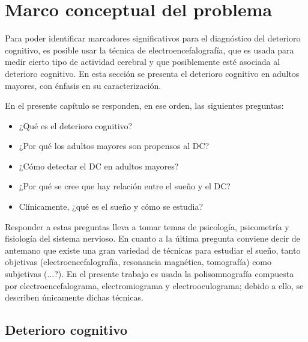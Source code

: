 
\chapter{Marco conceptual del problema}

Para poder identificar marcadores significativos para el diagnóstico del deterioro cognitivo, es 
posible usar la técnica de electroencefalografía, que es usada para medir cierto tipo de actividad 
cerebral y que posiblemente esté asociada al deterioro cognitivo. 
%
En esta sección se presenta el deterioro cognitivo en adultos mayores, con énfasis en su 
caracterización.

En el presente capítulo se responden, en ese orden, las siguientes preguntas:
\begin{itemize}
\item ¿Qué es el deterioro cognitivo?
\item ¿Por qué los adultos mayores son propensos al DC?
\item ¿Cómo detectar el DC en adultos mayores?
\item ¿Por qué se cree que hay relación entre el sueño y el DC?
\item Clínicamente, ¿qué es el sueño y cómo se estudia?
\end{itemize}

Responder a estas preguntas lleva a tomar temas de psicología, psicometría y fisiología del sistema nervioso. 
%
En cuanto a la última pregunta conviene decir de antemano que existe una gran variedad de técnicas para estudiar el sueño, tanto objetivas (electroencefalografía, resonancia magnética, tomografía) como subjetivas (...?). 
%
En el presente trabajo es usada la polisomnografía compuesta por electroencefalograma, electromiograma y electrooculograma; debido a ello, se describen únicamente dichas técnicas.


\section{Deterioro cognitivo}

